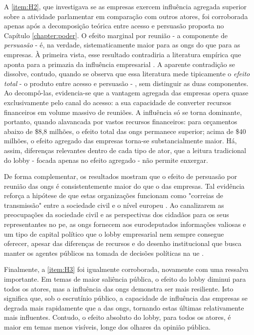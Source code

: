 A \ref{item:H2}, que investigava se as empresas exercem influência agregada superior sobre a atividade parlamentar em comparação com outros atores, foi corroborada apenas após a decomposição teórica entre acesso e persuasão proposta no Capítulo \ref{chapter:poder}. O efeito marginal por reunião - a componente de \textit{persuasão} - é, na verdade, sistematicamente maior para as \acrshort{ong}s do que para as empresas. À primeira vista, esse resultado contradiria a literatura empírica que aponta para a primazia da influência empresarial \cite{schlozman1986organized, baumgartner2009lobbying}. A aparente contradição se dissolve, contudo, quando se observa que essa literatura mede tipicamente o \textit{efeito total} - o produto entre acesso e persuasão - , sem distinguir as duas componentes. Ao decompô-las, evidencia-se que a vantagem agregada das empresas opera quase exclusivamente pelo canal do acesso: a sua capacidade de converter recursos financeiros em volume massivo de reuniões. A influência só se torna dominante, portanto, quando alavancada por vastos recursos financeiros: para orçamentos abaixo de \$8,8 milhões, o efeito total das \acrshort{ong}s permanece superior; acima de \$40 milhões, o efeito agregado das empresas torna-se substancialmente maior. Há, assim, diferenças relevantes dentro de cada tipo de ator, que a leitura tradicional do lobby - focada apenas no efeito agregado - não permite enxergar. 

De forma complementar, os resultados mostram que o efeito de persuasão por reunião das \acrshort{ong}s é consistentemente maior do que o das empresas. Tal evidência reforça a hipótese de que estas organizações funcionam como "correias de transmissão" entre a sociedade civil e o nível europeu \cite{pereira2025participacao}. Ao canalizarem as preocupações da sociedade civil e as perspectivas dos cidadãos para os seus representantes no \acrshort{pe}, as \acrshort{ong}s fornecem aos eurodeputados informações valiosas e um tipo de capital político que o lobby empresarial nem sempre consegue oferecer, apesar das diferenças de recursos e do desenho institucional que busca manter os agentes públicos na tomada de decisões políticas na \acrshort{ue} \cite{pereira2025participacao}.


Finalmente, a \ref{item:H3} foi igualmente corroborada, novamente com uma ressalva importante. Em temas de maior saliência pública, o efeito do lobby diminui para todos os atores, mas a influência das \acrshort{ong}s demonstra ser mais resiliente. Isto significa que, sob o escrutínio público, a capacidade de influência das empresas se degrada mais rapidamente que a das \acrshort{ong}s, tornando estas últimas relativamente mais influentes. Contudo, o efeito absoluto do lobby, para todos os atores, é maior em temas menos visíveis, longe dos olhares da opinião pública.

